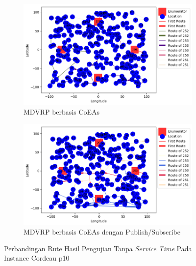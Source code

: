 \begin{figure}[H]
	\centering
	\begin{subfigure}[t]{\textwidth}
		\centering
		\includegraphics[width=\textwidth]{Resources/Images/cordeau_p10/cordeau_p10_notw_coes}
		\caption{MDVRP berbasis CoEAs}
		\label{fig:cordeau_p10_notw_coes}
	\end{subfigure}
	\begin{subfigure}[t]{\textwidth}
		\centering
		\includegraphics[width=\textwidth]{Resources/Images/cordeau_p10/cordeau_p10_notw_pubsub_coes}
		\caption{MDVRP berbasis CoEAs dengan Publish/Subscribe}
		\label{fig:cordeau_p10_notw_pubsub_coes}
	\end{subfigure}
	\caption{Perbandingan Rute Hasil Pengujian Tanpa \textit{Service Time} Pada Instance Cordeau p10}
	\label{fig:cordeau_p10_notw}
\end{figure}


